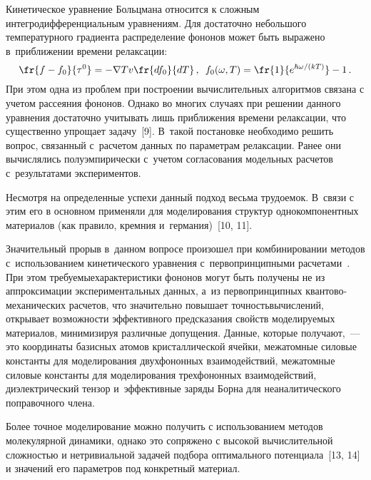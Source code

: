 \begin{multicols}{2}
    Кинетическое уравнение Больцмана относится к сложным 
    ин\-тег\-ро\-диф\-фе\-рен\-ци\-аль\-ным уравнениям. Для достаточно небольшого температурного 
градиента распределение фононов может быть выражено в~приближении 
времени релаксации:
    \begin{equation*}
    \fr{f-f_0}{\tau^0}=-\nabla T v \fr{df_0}{dT}\,,\enskip
    f_0(\omega, T)=\fr{1}{e^{\hbar\omega/(kT)}}-1\,.
    \end{equation*}
    При этом одна из проблем при построении вычислительных алгоритмов 
связана с учетом рассеяния фононов. Однако во многих случаях при решении 
данного уравнения достаточно учитывать лишь приближения времени 
релаксации, что существенно упрощает задачу~[9]. В~такой постановке 
необходимо решить вопрос, связанный с~расчетом данных по параметрам 
релаксации. Ранее они вычислялись полуэмпирически с~учетом согласования 
модельных расчетов с~результатами экспериментов. 

Несмотря на определенные 
успехи данный подход весьма трудоемок. В~связи с этим его в основном 
применяли для моделирования структур однокомпонентных материалов (как 
правило, кремния и~германия)~[10, 11]. 

Значительный прорыв в~данном вопросе 
произошел при комбинировании методов с~использованием кинетического 
уравнения с~первопринципными  
расчетами~\cite{8-ab, 9-ab, 12-ab}. При этом требуемые\linebreak \mbox{характеристики} фононов 
могут быть получены не из аппроксимации экспериментальных %
 данных, а~из 
первопринципных кван\-то\-во-ме\-ха\-ни\-че\-ских расчетов, что значительно 
повышает точность\linebreak вычислений, открывает возможности эффективного 
пред\-ска\-за\-ния свойств моделируемых {материалов}, минимизируя 
различные допущения. \mbox{Данные}, которые получают,~--- это координаты 
базисных атомов кристаллической ячейки, межатомные силовые константы для 
моделирования двухфононных взаимодействий, межатомные силовые 
константы для моделирования трехфононных \mbox{взаимодействий}, диэлектрический 
тензор и~эффективные заряды Борна для неаналитического поправочного члена.
    
    Более точное моделирование можно получить с использованием методов 
молекулярной динамики, однако это сопряжено с высокой вычислительной 
сложностью и нетривиальной задачей подбора оптимального потенциала~[13, 
14] и значений его параметров под конкретный материал. 
    

\end{multicols}
